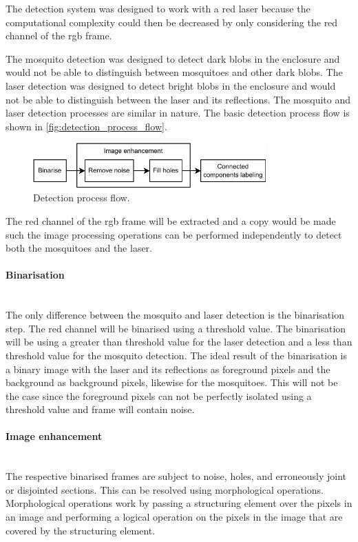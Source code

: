 The detection system was designed to work with a red laser because the computational complexity could then be decreased by only considering the red channel of the \gls{rgb} frame.

The mosquito detection was designed to detect dark blobs in the enclosure and would not be able to distinguish between mosquitoes and other dark blobs. The laser detection was designed to detect bright blobs in the enclosure and would not be able to distinguish between the laser and its reflections. The mosquito and laser detection processes are similar in nature. The basic detection process flow is shown in \autoref{fig:detection_process_flow}.

\begin{figure}[h]
    \centering
    \includegraphics[width=0.8\textwidth]{figures/detection/detection_process_flow.pdf}
    \caption{Detection process flow.}
    \label{fig:detection_process_flow}
\end{figure}

The red channel of the \gls{rgb} frame will be extracted and a copy would be made such the image processing operations can be performed independently to detect both the mosquitoes and the laser.

\paragraph{Binarisation}\mbox{}\\
The only difference between the mosquito and laser detection is the binarisation step. The red channel will be binarised using a threshold value. The binarisation will be using a greater than threshold value for the laser detection and a less than threshold value for the mosquito detection. The ideal result of the binarisation is a binary image with the laser and its reflections as foreground pixels and the background as background pixels, likewise for the mosquitoes. This will not be the case since the foreground pixels can not be perfectly isolated using a threshold value and frame will contain noise.

\paragraph{Image enhancement}\mbox{}\\
The respective binarised frames are subject to noise, holes, and erroneously joint or disjointed sections. This can be resolved using morphological operations. Morphological operations work by passing a structuring element over the pixels in an image and performing a logical operation on the pixels in the image that are covered by the structuring element.

